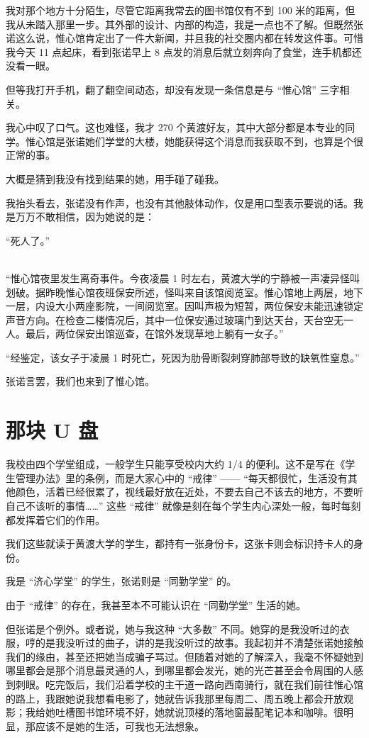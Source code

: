 \documentclass[UTF8]{ctexart}
\begin{document}
我对那个地方十分陌生，尽管它距离我常去的图书馆仅有不到 100 米的距离，但我从未踏入那里一步。其外部的设计、内部的构造，我是一点也不了解。但既然张诺这么说，惟心馆肯定出了一件大新闻，并且我的社交圈内都在转发这件事。可惜我今天 11 点起床，看到张诺早上 8 点发的消息后就立刻奔向了食堂，连手机都还没看一眼。

但等我打开手机，翻了翻空间动态，却没有发现一条信息是与 “惟心馆” 三字相关。

我心中叹了口气。这也难怪，我才 270 个黄渡好友，其中大部分都是本专业的同学。惟心馆是张诺她们学堂的大楼，她能获得这个消息而我获取不到，也算是个很正常的事。

大概是猜到我没有找到结果的她，用手碰了碰我。

我抬头看去，张诺没有作声，也没有其他肢体动作，仅是用口型表示要说的话。我是万万不敢相信，因为她说的是：

“死人了。”

~\\

“惟心馆夜里发生离奇事件。今夜凌晨 1 时左右，黄渡大学的宁静被一声凄异怪叫划破。据昨晚惟心馆夜班保安所述，怪叫来自该馆阅览室。惟心馆地上两层，地下一层，内设大小两座影院，一间阅览室。因叫声极为短暂，两位保安未能迅速锁定声音方向。在检查二楼情况后，其中一位保安通过玻璃门到达天台，天台空无一人。最后，两位保安出馆巡查，在馆外发现草地上躺有一女子。”

“经鉴定，该女子于凌晨 1 时死亡，死因为肋骨断裂刺穿肺部导致的缺氧性窒息。”

张诺言罢，我们也来到了惟心馆。

\section{那块 U 盘}

我校由四个学堂组成，一般学生只能享受校内大约 1/4 的便利。这不是写在《学生管理办法》里的条例，而是大家心中的 “戒律” —— “每天都很忙，生活没有其他颜色，活着已经很累了，视线最好放在近处，不要去自己不该去的地方，不要听自己不该听的事情……” 这些 “戒律” 就像是刻在每个学生内心深处一般，每时每刻都发挥着它们的作用。

我们这些就读于黄渡大学的学生，都持有一张身份卡，这张卡则会标识持卡人的身份。

我是 “济心学堂” 的学生，张诺则是 “同勤学堂” 的。

由于 “戒律” 的存在，我甚至本不可能认识在 “同勤学堂” 生活的她。

但张诺是个例外。或者说，她与我这种 “大多数” 不同。她穿的是我没听过的衣服，哼的是我没听过的曲子，讲的是我没听过的故事。我起初并不清楚张诺她接触我们的缘由，甚至还把她当成骗子骂过。但随着对她的了解深入，我毫不怀疑她到哪里都会是那个消息最灵通的人，到哪里都会发光，她的光芒甚至会令周围的人感到刺眼。吃完饭后，我们沿着学校的主干道一路向西南骑行，就在我们前往惟心馆的路上，我跟她说我想看电影了，她就告诉我那里每周二、周五晚上都会开放观影；我给她吐槽图书馆环境不好，她就说顶楼的落地窗最配笔记本和咖啡。很明显，那应该不是她的生活，可我也无法想象。
\end{document}
